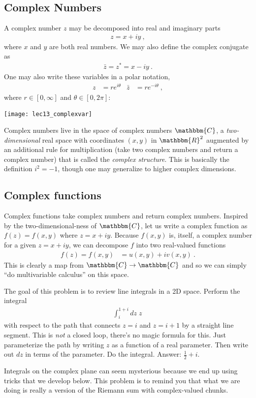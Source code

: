 \subsection{Complex Numbers}

A complex number $z$ may be decomposed into real and imaginary parts
\begin{align}
	z = x + i y \ ,
\end{align}
where $x$ and $y$ are both real numbers. We may also define the complex conjugate as
\begin{align}
	\bar z = z^* = x - i y \ .
\end{align}
One may also write these variables in a polar notation,
\begin{align}
	z &= re^{i\theta}
	&
	\bar z &= re^{-i\theta} \ ,
\end{align}
where $r \in [0,\infty]$ and $\theta \in [0, 2\pi]$:
\begin{center}
\texttt{[image: lec13\_complexvar]}
\end{center}
Complex numbers live in the space of complex numbers $\mathbbm{C}$, a \emph{two-dimensional} real space with coordinates $(x,y)$ in $\mathbbm{R}^2$ augmented by an additional rule for multiplication (take two complex numbers and return a complex number) that is called the \emph{complex structure}. This is basically the definition $i^2 = -1$, though one may generalize to higher complex dimensions. 


\subsection{Complex functions}

Complex functions take complex numbers and return complex numbers. Inspired by the two-dimensional-ness of $\mathbbm{C}$, let us write a complex function as $f(z)=f(x,y)$ where $z = x+i y$. Because $f(x,y)$ is, itself, a complex number for a given $z=x+i y$, we can decompose $f$ into two real-valued functions
\begin{align}
	f(z) = f(x,y) &= u(x,y) + i v(x,y) \ .
\end{align}
This is clearly a map from $\mathbbm{C} \to \mathbbm{C}$ and so we can simply ``do multivariable calculus'' on this space. 

\begin{exercise}
The goal of this problem is to review line integrals in a 2D space. Perform the integral
\begin{align}
	\int_i^{1+i} dz \; z \,
\end{align}
with respect to the path that connects $z=i$ and $z=i+1$ by a straight line segment. This is \emph{not} a closed loop, there's no magic formula for this. Just parameterize the path by writing $z$ as a function of a real parameter. Then write out $dz$ in terms of the parameter. Do the integral. Answer: $\frac{1}{2}+i$.

 Integrals on the complex plane can seem mysterious because we end up using tricks that we develop below. This problem is to remind you that what we are doing is really a version of the Riemann sum with complex-valued chunks. 
\end{exercise}

